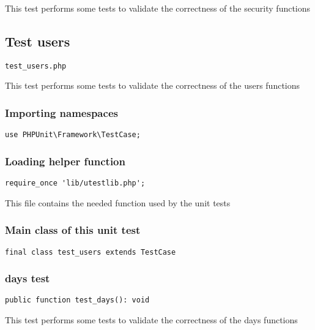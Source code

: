 \documentclass[a4paper]{article}
\begin{document}
This test performs some tests to validate the correctness
of the security functions

\hypertarget{toc381}{}
\subsection{Test users}

\begin{lstlisting}
test_users.php
\end{lstlisting}

This test performs some tests to validate the correctness
of the users functions

\hypertarget{toc382}{}
\subsubsection{Importing namespaces}

\begin{lstlisting}
use PHPUnit\Framework\TestCase;
\end{lstlisting}

\hypertarget{toc383}{}
\subsubsection{Loading helper function}

\begin{lstlisting}
require_once 'lib/utestlib.php';
\end{lstlisting}

This file contains the needed function used by the unit tests

\hypertarget{toc384}{}
\subsubsection{Main class of this unit test}

\begin{lstlisting}
final class test_users extends TestCase
\end{lstlisting}

\hypertarget{toc385}{}
\subsubsection{days test}

\begin{lstlisting}
public function test_days(): void
\end{lstlisting}

This test performs some tests to validate the correctness
of the days functions
\end{document}
